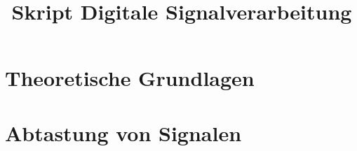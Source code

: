 \documentclass[ngerman]{article}
\title{Skript Digitale Signalverarbeitung}
\begin{document}

%
%
\section{Theoretische Grundlagen}\label{basics}
%

%
%
\section{Abtastung von Signalen}\label{sec:sampling}
%

%
%

\end{document}
